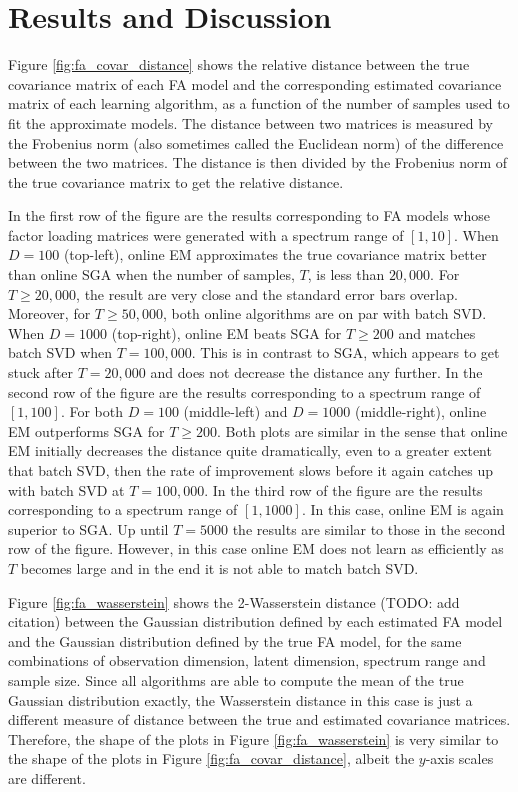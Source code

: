 \documentclass[msc,deptreport.inf]{infthesis} %
\begin{document}
\section{Results and Discussion}

Figure \ref{fig:fa_covar_distance} shows the relative distance between the true covariance matrix of each FA model and the corresponding estimated covariance matrix of each learning algorithm, as a function of the number of samples used to fit the approximate models. The distance between two matrices is measured by the Frobenius norm (also sometimes called the Euclidean norm) of the difference between the two matrices. The distance is then divided by the Frobenius norm of the true covariance matrix to get the relative distance. 

In the first row of the figure are the results corresponding to FA models whose factor loading matrices were generated with a spectrum range of $[1, 10]$. When $D=100$ (top-left), online EM approximates the true covariance matrix better than online SGA when the number of samples, $T$, is less than $20,000$. For $T \geq 20,000$, the result are very close and the standard error bars overlap. Moreover, for $T \geq 50,000$, both online algorithms are on par with batch SVD. When $D=1000$ (top-right), online EM beats SGA for $T \geq 200$ and matches batch SVD when $T=100,000$. This is in contrast to SGA, which appears to get stuck after $T=20,000$ and does not decrease the distance any further. In the second row of the figure are the results corresponding to a spectrum range of $[1, 100]$. For both $D=100$ (middle-left) and $D=1000$ (middle-right), online EM outperforms SGA for $T \geq 200$. Both plots are similar in the sense that online EM initially decreases the distance quite dramatically, even to a greater extent that batch SVD, then the rate of improvement slows before it again catches up with batch SVD at $T=100,000$. In the third row of the figure are the results corresponding to a spectrum range of $[1, 1000]$. In this case, online EM is again superior to SGA. Up until $T=5000$ the results are similar to those in the second row of the figure. However, in this case online EM does not learn as efficiently as $T$ becomes large and in the end it is not able to match batch SVD.

Figure \ref{fig:fa_wasserstein} shows the 2-Wasserstein distance (TODO: add citation) between the Gaussian distribution defined by each estimated FA model and the Gaussian distribution defined by the true FA model, for the same combinations of observation dimension, latent dimension, spectrum range and sample size. Since all algorithms are able to compute the mean of the true Gaussian distribution exactly, the Wasserstein distance in this case is just a different measure of distance between the true and estimated covariance matrices. Therefore, the shape of the plots in Figure \ref{fig:fa_wasserstein} is very similar to the shape of the plots in Figure \ref{fig:fa_covar_distance}, albeit the $y$-axis scales are different. 
\end{document}
